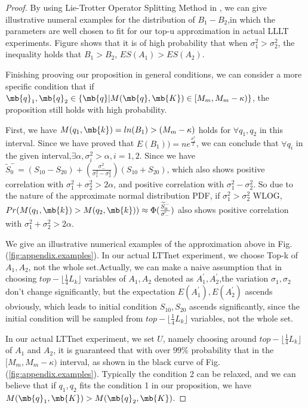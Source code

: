 \begin{appendices}
\begin{proof}
By using Lie-Trotter Operator Splitting Method in \cite{lo2012sum}, we can give illustrative numeral examples for the distribution of $B_1-B_2$,in which the parameters are well chosen to fit for our top-u approximation in actual LLLT experiments. Figure shows that it is of high probability that when $\sigma_1^2>\sigma_2^2$, the inequality holds that $B_1>B_2$, $ES(A_1)>ES(A_2)$.

Finishing prooving our proposition in general conditions, we can consider a more specific condition that if $\mb{q}_1, \mb{q}_2 \in \{ \mb{q} | M(\mb{q}, \mb{K}) \in [ M_{m},  M_{m} - \kappa)\}$, the proposition still holds with high probability.

First, we have $M(q_1,\mb{k})=ln(B_1)>(M_m-\kappa)$ holds for $\forall q_1,q_2$ in this interval. Since we have proved that $E(B_1))=ne^{\frac{\sigma_1^2}{2}}$, we can conclude that $\forall q_i$ in the given interval,$\exists \alpha, \sigma_i^2>\alpha, i=1,2$. Since we have $\widetilde{S}_{0}^{-}=(S_{10}-S_{20})+\left(\frac{\sigma_{-}^{2}}{\sigma_{1}^{2}-\sigma_{2}^{2}}\right) (S_{10}+S_{20})$, which also shows positive correlation with $\sigma_1^2+\sigma_2^2>2\alpha$, and positive correlation with $\sigma_1^2-\sigma_2^2$. So due to the nature of the approximate normal distribution PDF, if $\sigma_1^2>\sigma_2^2$ WLOG, $Pr(M(q_1,\mb{k})>M(q_2,\mb{k}))\approx \Phi(\frac{\widetilde{S}_{0}^{-}}{\tilde{\sigma_-}})$ also shows positive correlation with $\sigma_1^2+\sigma_2^2>2\alpha$.

We give an illustrative numerical examples of the approximation above in Fig.(\ref{fig:appendix.examples}). In our actual LTTnet experiment, we choose Top-k of $A_1,A_2$, not the whole set.Actually, we can make a naive assumption that in choosing $top-\lfloor\frac{1}{4}L_k\rfloor$ variables of $A_1,A_2$ denoted as $A_1^{'} , A_2^{'}$,the variation $\sigma_1,\sigma_2$ don't change significantly, but the expectation $E(A_1^{'}) , E(A_2^{'})$ 
ascends obviously, which leads to initial condition $S_{10},S_{20}$ ascends significantly, since the initial condition will be sampled from $top-\lfloor\frac{1}{4}L_k\rfloor$ variables, not the whole set.

In our actual LTTnet experiment, we set $U$, namely choosing around $top-\lfloor\frac{1}{4}L_k\rfloor$ of $A_1$ and $A_2$, it is guaranteed that with over $99\%$ probability that in the $[ M_{m},  M_{m} - \kappa)$ interval, as shown in the black curve of Fig.(\ref{fig:appendix.examples}). Typically the condition 2 can be relaxed, and we can believe that if $q_1,q_2$ fits the condition 1 in our proposition, we have $M(\mb{q}_1, \mb{K}) > M(\mb{q}_2, \mb{K})$.
\end{proof}


\end{appendices}
